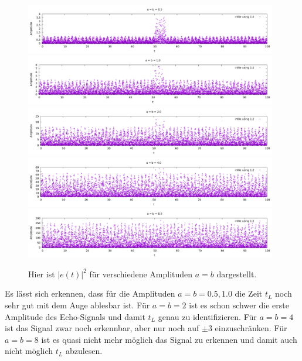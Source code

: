 \documentclass[ngerman]{scrartcl}
\begin{document}
\begin{figure}[htbp]
	\centering
	\includegraphics[width=0.98\textwidth]{plots/echo/0.5}
	\includegraphics[width=0.98\textwidth]{plots/echo/1.0}
	\includegraphics[width=0.98\textwidth]{plots/echo/2.0}
	\includegraphics[width=0.98\textwidth]{plots/echo/4.0}
	\includegraphics[width=0.98\textwidth]{plots/echo/8.0}
	\caption[$|e(t)|^2$]{Hier ist $|e(t)|^2$ für verschiedene Amplituden $a=b$ dargestellt.}
	\label{fig:2.1}
\end{figure} 
Es lässt sich erkennen, dass für die Amplituden
$a=b=0.5, 1.0$ die Zeit $t_L$ noch sehr gut mit dem Auge ablesbar ist.
Für $a=b=2$ ist es schon schwer die erste Amplitude des Echo-Signals
und damit $t_L$ genau zu identifizieren.
Für $a=b=4$ ist das Signal zwar noch erkennbar, aber nur noch auf $\pm3$ einzuschr\"anken.
Für $a=b=8$ ist es quasi nicht mehr möglich das Signal zu erkennen und damit auch nicht möglich $t_L$ abzulesen. 

\subsection{}
\end{document}

